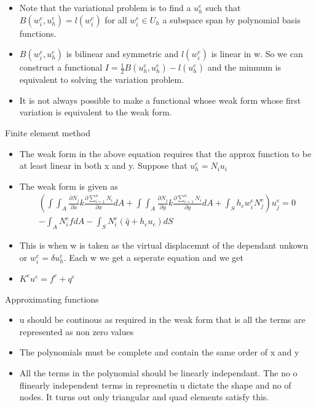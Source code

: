 	\begin{frame}
		\begin{itemize}
			\item Note that the variational problem is to find a $u_h^e$ such that  $B(w_i^e,u_h^e) = l(w_i^e)$ for all $w_i^e \in U_h$ a subspace span by polynomial basis functions.
			\item $B(w_i^e,u_h^e) $ is bilinear and symmetric and $ l(w_i^e)$ is linear in w. So we can construct a functional $I = \frac{1}{2}B(u_h^e,u_h^e) -l(u_h^e)$ and the minmum is equivalent to solving the variation problem.
			\item It is not always possible to make a functional whose weak form  whose first variation is equivalent to the weak form. 
			
		\end{itemize}
	\end{frame}


	\begin{frame}{Finite element method}
		\begin{itemize}
			\item The weak form in the above equation requires that the approx function to be at least linear in both x and y. Suppose that $u_h^e = N_i u_i$
			\item The weak form is given as 
			\begin{equation}
			\begin{aligned}
				\left(\int\int _A \frac{\partial N_j}{\partial x} k \frac{\partial \sum_{i=1}^{n} N_i }{\partial x} dA +
				\int\int _A \frac{\partial N_j}{\partial y} k \frac{\partial \sum_{i=1}^{n} N_i }{\partial y} dA + \int_S h_c w_i^e N_j^e \right)u_j^e= 0 \\
				- \int_A N_i^ef dA - \int_S N_i^e(\hat{q}+h_cu_c)dS
			\end{aligned}
			\end{equation}	
			\item  This is when w is taken as the virtual displacemnt of the dependant unkown or $w_i^e = \delta u_h^e$. Each w we get a seperate equation and we get 
			\item $K^eu^e = f^e + q^e$
		\end{itemize}
	\end{frame}



	\begin{frame}{Approximating functions}
		\begin{itemize}
			\item u should be continous as required in the weak form that is all the terms are represented as non zero values
			\item  The polynomials must be complete and contain the same order of x and y
			\item All the terms in the polynomial should be linearly independant. The no o flinearly independent terms in represnetin u dictate the shape and no of nodes. It turns out only triangular and quad elements satisfy this.
		\end{itemize}
	\end{frame}




